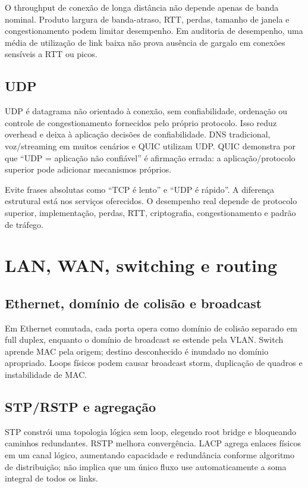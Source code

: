 O throughput de conexão de longa distância não depende apenas de banda nominal. Produto largura de banda-atraso, RTT, perdas, tamanho de janela e congestionamento podem limitar desempenho. Em auditoria de desempenho, uma média de utilização de link baixa não prova ausência de gargalo em conexões sensíveis a RTT ou picos.

\subsection{UDP}

UDP é datagrama não orientado à conexão, sem confiabilidade, ordenação ou controle de congestionamento fornecidos pelo próprio protocolo. Isso reduz overhead e deixa à aplicação decisões de confiabilidade. DNS tradicional, voz/streaming em muitos cenários e QUIC utilizam UDP. QUIC demonstra por que ``UDP = aplicação não confiável'' é afirmação errada: a aplicação/protocolo superior pode adicionar mecanismos próprios.

\begin{cebraspe}
Evite frases absolutas como ``TCP é lento'' e ``UDP é rápido''. A diferença estrutural está nos serviços oferecidos. O desempenho real depende de protocolo superior, implementação, perdas, RTT, criptografia, congestionamento e padrão de tráfego.
\end{cebraspe}

\section{LAN, WAN, switching e routing}

\subsection{Ethernet, domínio de colisão e broadcast}

Em Ethernet comutada, cada porta opera como domínio de colisão separado em full duplex, enquanto o domínio de broadcast se estende pela VLAN. Switch aprende MAC pela origem; destino desconhecido é inundado no domínio apropriado. Loops físicos podem causar broadcast storm, duplicação de quadros e instabilidade de MAC.

\subsection{STP/RSTP e agregação}

STP constrói uma topologia lógica sem loop, elegendo root bridge e bloqueando caminhos redundantes. RSTP melhora convergência. LACP agrega enlaces físicos em um canal lógico, aumentando capacidade e redundância conforme algoritmo de distribuição; não implica que um único fluxo use automaticamente a soma integral de todos os links.

